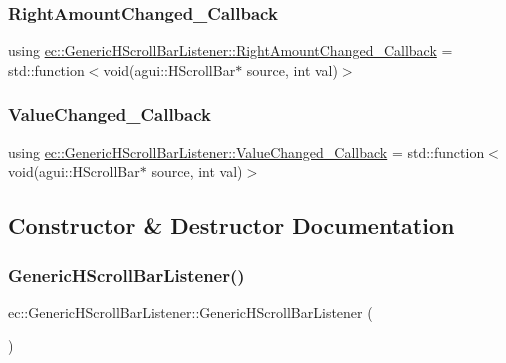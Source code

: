 \subsubsection{\texorpdfstring{Right\+Amount\+Changed\+\_\+\+Callback}{RightAmountChanged\_Callback}}
{\footnotesize\ttfamily using \mbox{\hyperlink{classec_1_1_generic_h_scroll_bar_listener_a8fa94a611c4160acb1c5bc062046fc8a}{ec\+::\+Generic\+H\+Scroll\+Bar\+Listener\+::\+Right\+Amount\+Changed\+\_\+\+Callback}} =  std\+::function$<$void(agui\+::\+H\+Scroll\+Bar$\ast$ source, int val)$>$}

\mbox{\label{classec_1_1_generic_h_scroll_bar_listener_ad02a375c4835a99a41bcd97b6a408637}} 
\subsubsection{\texorpdfstring{Value\+Changed\+\_\+\+Callback}{ValueChanged\_Callback}}
{\footnotesize\ttfamily using \mbox{\hyperlink{classec_1_1_generic_h_scroll_bar_listener_ad02a375c4835a99a41bcd97b6a408637}{ec\+::\+Generic\+H\+Scroll\+Bar\+Listener\+::\+Value\+Changed\+\_\+\+Callback}} =  std\+::function$<$void(agui\+::\+H\+Scroll\+Bar$\ast$ source, int val)$>$}



\subsection{Constructor \& Destructor Documentation}
\mbox{\label{classec_1_1_generic_h_scroll_bar_listener_a4b95d78b240d90fe4ad216460980cfb1}} 
\subsubsection{\texorpdfstring{Generic\+H\+Scroll\+Bar\+Listener()}{GenericHScrollBarListener()}}
{\footnotesize\ttfamily ec\+::\+Generic\+H\+Scroll\+Bar\+Listener\+::\+Generic\+H\+Scroll\+Bar\+Listener (\begin{DoxyParamCaption}{ }\end{DoxyParamCaption})\hspace{0.3cm}{\ttfamily [explicit]}}

